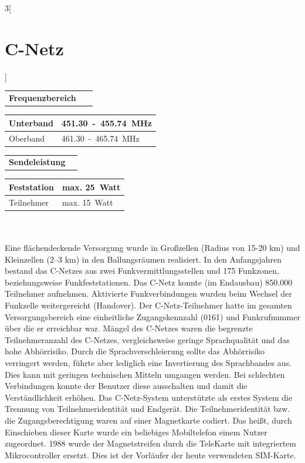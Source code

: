 \begin{multicols}{3}[\section{C-Netz}]
\begin{boxedminipage}{\linewidth}
\begin{tabular}{p{}p{2.7 cm}}
\textbf{Frequenzbereich}~\cite{c-netz.1} & \\
\end{tabular}
\begin{tabular}{p{}|p{2.7 cm}}
      Unterband  & \SI{451,30}-\SI{455,74}{\mega\hertz}\\
      \hline
      Oberband  & \SI{461,30}-\SI{465,74}{\mega\hertz}\\
\end{tabular}

\begin{tabular}{p{}p{2.7 cm}}
\textbf{Sendeleistung}& \\
\end{tabular}
\begin{tabular}{p{}|p{2.7 cm}}
      Feststation & max. \SI{25} Watt\\
      \hline
      Teilnehmer & max. \SI{15} Watt\\
\end{tabular}
\end{boxedminipage} \\
\\ Eine flächendeckende Versorgung wurde in Großzellen (Radius von 15-20 km) und Kleinzellen (2–3 km) in den Ballungsräumen realisiert. In den Anfangsjahren bestand das C-Netzes aus zwei Funkvermittlungsstellen und 175 Funkzonen, beziehungsweise Funkfeststationen. Das C-Netz konnte (im Endausbau) 850.000 Teilnehmer aufnehmen. Aktivierte Funkverbindungen wurden beim Wechsel der Funkzelle weitergereicht (Handover). Der C-Netz-Teilnehmer hatte im gesamten Versorgungsbereich eine einheitliche Zugangskennzahl (0161) und Funkrufnummer über die er erreichbar war. Mängel des C-Netzes waren die begrenzte Teilnehmeranzahl des C-Netzes, vergleichsweise geringe Sprachqualität und das hohe Abhörrisiko. Durch die Sprachverschleierung sollte das Abhörrisiko verringert werden, führte aber lediglich eine Invertierung des Sprachbandes aus. Dies kann mit geringen technischen Mitteln umgangen werden. Bei schlechten Verbindungen konnte der Benutzer diese ausschalten und damit die Verständlichkeit erhöhen.
Das C-Netz-System unterstützte als erstes System die Trennung von Teilnehmeridentität und Endgerät. Die Teilnehmeridentität bzw. die Zugangsberechtigung waren auf einer Magnetkarte codiert. Das heißt, durch Einschieben dieser Karte wurde ein beliebiges Mobiltelefon einem Nutzer zugeordnet. 1988 wurde der Magnetstreifen durch die TeleKarte mit integriertem Mikrocontroller ersetzt. Dies ist der Vorläufer der heute verwendeten SIM-Karte.

\end{multicols}
